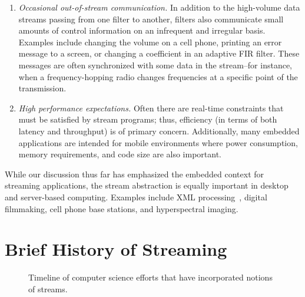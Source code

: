 \begin{enumerate}

\item {\it Occasional out-of-stream communication.}  In addition to
  the high-volume data streams passing from one filter to another,
  filters also communicate small amounts of control information on an
  infrequent and irregular basis.  Examples include changing the
  volume on a cell phone, printing an error message to a screen, or
  changing a coefficient in an adaptive FIR filter.  These messages
  are often synchronized with some data in the stream--for instance,
  when a frequency-hopping radio changes frequencies at a specific
  point of the transmission.

\item {\it High performance expectations.}  Often there are real-time
  constraints that must be satisfied by stream programs; thus,
  efficiency (in terms of both latency and throughput) is of primary
  concern.  Additionally, many embedded applications are intended for
  mobile environments where power consumption, memory requirements,
  and code size are also important.

\end{enumerate}

While our discussion thus far has emphasized the embedded context for
streaming applications, the stream abstraction is equally important in
desktop and server-based computing.  Examples include XML
processing~\cite{barton_streaming_2003}, digital filmmaking, cell
phone base stations, and hyperspectral imaging.


\section{Brief History of Streaming}

\begin{figure}[t]
\caption{Timeline of computer science efforts that have incorporated
  notions of streams.\protect\label{fig:history-of-streaming}}
\end{figure}

